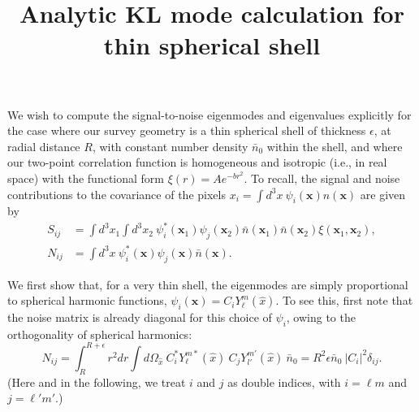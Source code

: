 \documentclass{article}
\title{Analytic KL mode calculation for thin spherical shell}
\date{}
\renewcommand{\vec}[1]{\bm{#1}}
\newcommand{\nbar}{\bar{n}}
\begin{document}
\maketitle

We wish to compute the signal-to-noise eigenmodes and eigenvalues explicitly
for the case where our survey geometry is a thin spherical shell of thickness
$\epsilon$, at radial distance $R$, with constant number density $\nbar_0$
within the shell, and where our two-point correlation function is homogeneous
and isotropic (i.e., in real space) with the functional form $\xi(r) = A e^{-br^2}$.
To recall, the signal and noise contributions to the covariance of the pixels
$x_i = \int d^3x~ \psi_i(\vec{x}) n(\vec{x})$ are given by
\begin{align}
    S_{ij} &= \int d^3x_1 \int d^3x_2~ \psi_i^*(\vec{x}_1) \psi_j(\vec{x}_2) \nbar(\vec{x}_1) \nbar(\vec{x}_2) \xi(\vec{x}_1, \vec{x}_2), \\
    N_{ij} &= \int d^3x~ \psi_i^*(\vec{x}) \psi_j(\vec{x}) \nbar(\vec{x}).
\end{align}

We first show that, for a very thin shell, the eigenmodes are simply
proportional to spherical harmonic functions,
$\psi_i(\vec{x}) = C_i Y_\ell^m(\hat{x})$.
To see this, first note that the noise matrix is already diagonal for this
choice of $\psi_i$, owing to the orthogonality of spherical harmonics:
\begin{equation}
    N_{ij} = \int_R^{R+\epsilon} r^2 dr \int d\Omega_{\hat{x}}~ C_i^* Y_\ell^{m*}(\hat{x}) ~ C_j Y_{l'}^{m'}(\hat{x}) ~ \nbar_0
           = R^2 \epsilon \nbar_0~ |C_i|^2 \delta_{ij}.
\end{equation}
(Here and in the following, we treat $i$ and $j$ as double indices, with
$i = \ell m$ and $j = \ell' m'$.)
\end{document}
